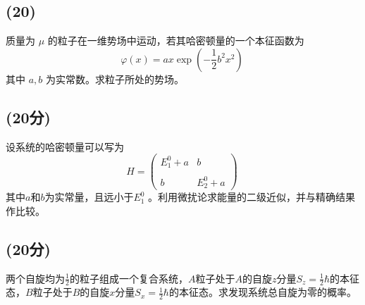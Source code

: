 \subsection{(20)}
质量为 $\mu$ 的粒子在一维势场中运动，若其哈密顿量的一个本征函数为
\[
\varphi(x) = a x \exp \left( -\frac{1}{2}b^2 x^2 \right)~
\]
其中 $a, b$ 为实常数。求粒子所处的势场。
\subsection{(20分)}
设系统的哈密顿量可以写为
$$H = \begin{pmatrix} E^0_1 + a & b \\\\ b & E^0_2 + a \end{pmatrix}~$$
其中$a$和$b$为实常量，且远小于$E^0_1$ 。利用微扰论求能量的二级近似，并与精确结果作比较。
\subsection{(20分)}
两个自旋均为$\frac{1}{2}$的粒子组成一个复合系统，$A$粒子处于$A$的自旋$z$分量$S_z=\frac{1}{2}\hbar$的本征态，$B$粒子处于$B$的自旋$x$分量$S_x=\frac{1}{2}\hbar$的本征态。求发现系统总自旋为零的概率。